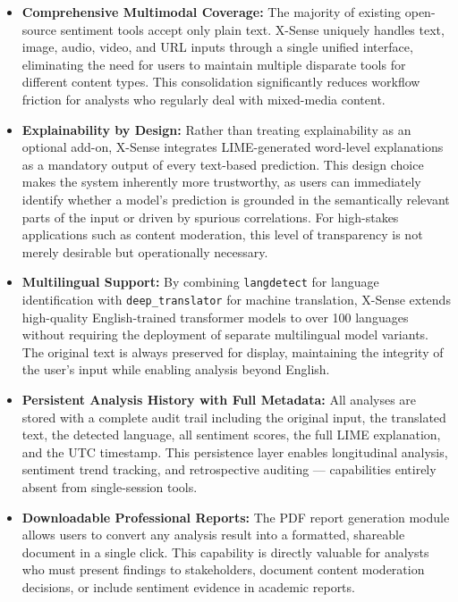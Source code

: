 \documentclass[12pt, a4paper]{report}
\begin{document}
\begin{itemize}[noitemsep, leftmargin=1.5em]
    \item \textbf{Comprehensive Multimodal Coverage:} The majority of existing open-source sentiment tools accept only plain text. X-Sense uniquely handles text, image, audio, video, and URL inputs through a single unified interface, eliminating the need for users to maintain multiple disparate tools for different content types. This consolidation significantly reduces workflow friction for analysts who regularly deal with mixed-media content.

    \item \textbf{Explainability by Design:} Rather than treating explainability as an optional add-on, X-Sense integrates LIME-generated word-level explanations as a mandatory output of every text-based prediction. This design choice makes the system inherently more trustworthy, as users can immediately identify whether a model's prediction is grounded in the semantically relevant parts of the input or driven by spurious correlations. For high-stakes applications such as content moderation, this level of transparency is not merely desirable but operationally necessary.

    \item \textbf{Multilingual Support:} By combining \texttt{langdetect} for language identification with \texttt{deep\_\allowbreak translator} for machine translation, X-Sense extends high-quality English-trained transformer models to over 100 languages without requiring the deployment of separate multilingual model variants. The original text is always preserved for display, maintaining the integrity of the user's input while enabling analysis beyond English.

    \item \textbf{Persistent Analysis History with Full Metadata:} All analyses are stored with a complete audit trail including the original input, the translated text, the detected language, all sentiment scores, the full LIME explanation, and the UTC timestamp. This persistence layer enables longitudinal analysis, sentiment trend tracking, and retrospective auditing --- capabilities entirely absent from single-session tools.

    \item \textbf{Downloadable Professional Reports:} The PDF report generation module allows users to convert any analysis result into a formatted, shareable document in a single click. This capability is directly valuable for analysts who must present findings to stakeholders, document content moderation decisions, or include sentiment evidence in academic reports.


\end{itemize}
\end{document}
